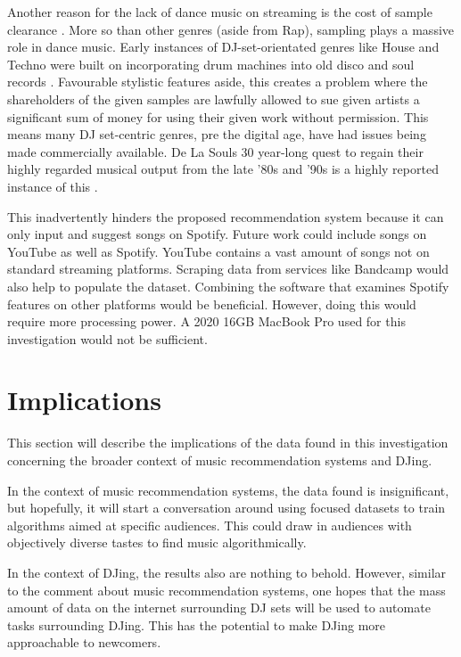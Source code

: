 Another reason for the lack of dance music on streaming is the cost of sample clearance \citep{morey_copyright_2013}. More so than other genres (aside from Rap), sampling plays a massive role in dance music. Early instances of DJ-set-orientated genres like House and Techno were built on incorporating drum machines into old disco and soul records \citep{reynolds_energy_2013}. Favourable stylistic features aside, this creates a problem where the shareholders of the given samples are lawfully allowed to sue given artists a significant sum of money for using their given work without permission. This means many DJ set-centric genres, pre the digital age, have had issues being made commercially available. De La Souls 30 year-long quest to regain their highly regarded musical output from the late '80s and '90s is a highly reported instance of this \citep{saunders_soul_2023}.

This inadvertently hinders the proposed recommendation system because it can only input and suggest songs on Spotify. Future work could include songs on YouTube as well as Spotify. YouTube contains a vast amount of songs not on standard streaming platforms. Scraping data from services like Bandcamp would also help to populate the dataset. Combining the software that examines Spotify features on other platforms would be beneficial. However, doing this would require more processing power. A 2020 16GB MacBook Pro used for this investigation would not be sufficient.



\section{Implications}
This section will describe the implications of the data found in this investigation concerning the broader context of music recommendation systems and DJing.

In the context of music recommendation systems, the data found is insignificant, but hopefully, it will start a conversation around using focused datasets to train algorithms aimed at specific audiences. This could draw in audiences with objectively diverse tastes to find music algorithmically.

In the context of DJing, the results also are nothing to behold. However, similar to the comment about music recommendation systems, one hopes that the mass amount of data on the internet surrounding DJ sets will be used to automate tasks surrounding DJing. This has the potential to make DJing more approachable to newcomers.  



